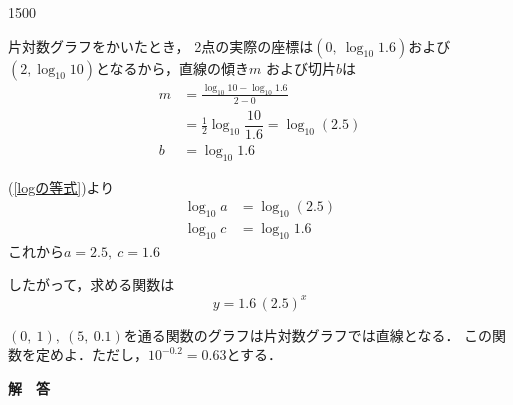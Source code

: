 \documentclass{b5-kaku}
\begin{document}
\begin{layer}{150}{0}

\end{layer}

\begin{solution}
\begin{mawarikomi}[10]{60mm}{}
片対数グラフをかいたとき，
2点の実際の座標は$(0,\ \log_{10}1.6)$\vspace{1mm}および
$(2,\log_{10}10)$となるから，直線の傾き$m$
および切片$b$は
\begin{align*}
m&=\frac{\log_{10}10-\log_{10}1.6}{2-0}\\
&=\frac{1}{2}\log_{10}\dfrac{10}{1.6}=\log_{10}(2.5)\\
b&=\log_{10}1.6
\end{align*}

(\ref{logの等式})より
\begin{align*}
\log_{10}a&=\log_{10}(2.5)\\ 
\log_{10}c&=\log_{10}{1.6}
\end{align*}
これから$a=2.5,\ c=1.6$ 

\noindent
したがって，求める関数は
\[
y=1.6\,(2.5)^x\tag*{\qed}
\]
\end{mawarikomi}
\end{solution}

\begin{question}
$(0,\ 1),\ (5,\ 0.1)$を通る関数のグラフは片対数グラフでは直線となる．
この関数を定めよ．ただし，$10^{-0.2}=0.63$とする．
\end{question}

\newpage

\begin{center}
{\large\bf 解　答}
\end{center}
\end{document}
